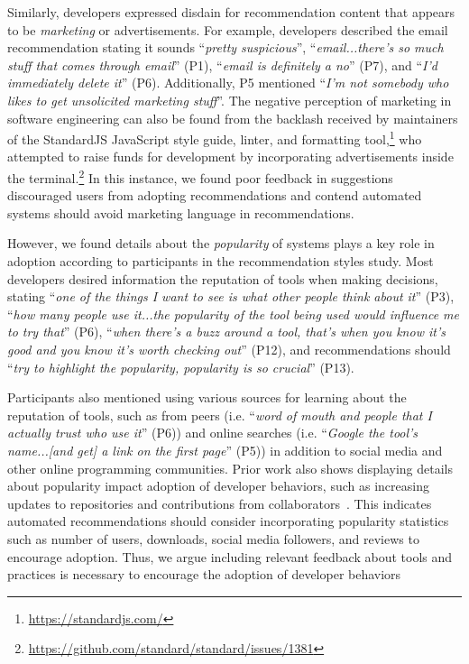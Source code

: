 Similarly, developers expressed disdain for recommendation content that appears to be \textit{marketing} or advertisements. For example, developers described the email recommendation stating it sounds ``\textit{pretty suspicious}'', ``\textit{email...there’s so much stuff that comes through email}'' (P1), ``\textit{email is definitely a no}'' (P7), and ``\textit{I'd immediately delete it}'' (P6). Additionally, P5 mentioned ``\textit{I’m not somebody who likes to get unsolicited marketing stuff}''. The negative perception of marketing in software engineering can also be found from the backlash received by maintainers of the StandardJS JavaScript style guide, linter, and formatting tool,\footnote{\url{https://standardjs.com/}} who attempted to raise funds for development by incorporating advertisements inside the terminal.\footnote{\url{https://github.com/standard/standard/issues/1381}} In this instance, we found poor feedback in suggestions discouraged users from adopting recommendations and contend automated systems should avoid marketing language in recommendations.

However, we found details about the \textit{popularity} of systems plays a key role in adoption according to participants in the recommendation styles study. Most developers desired information the reputation of tools when making decisions, stating ``\textit{one of the things I want to see is what other people think about it}'' (P3), ``\textit{how many people use it...the popularity of the tool being used would influence me to try that}'' (P6), ``\textit{when there’s a buzz around a tool, that’s when you know it’s good and you know it’s worth checking out}'' (P12), and recommendations should ``\textit{try to highlight the popularity, popularity is so crucial}'' (P13). 

Participants also mentioned using various sources for learning about the reputation of tools, such as from peers (i.e. ``\textit{word of mouth and people that I actually trust who use it}'' (P6)) and online searches (i.e. ``\textit{Google the tool's name...[and get] a link on the first page}'' (P5)) in addition to social media and other online programming communities. Prior work also shows displaying details about popularity impact adoption of developer behaviors, such as increasing updates to repositories and contributions from collaborators~\cite{aggarwal2014co}. This indicates automated recommendations should consider incorporating popularity statistics such as number of users, downloads, social media followers, and reviews to encourage adoption. Thus, we argue including relevant feedback about tools and practices is necessary to encourage the adoption of developer behaviors

